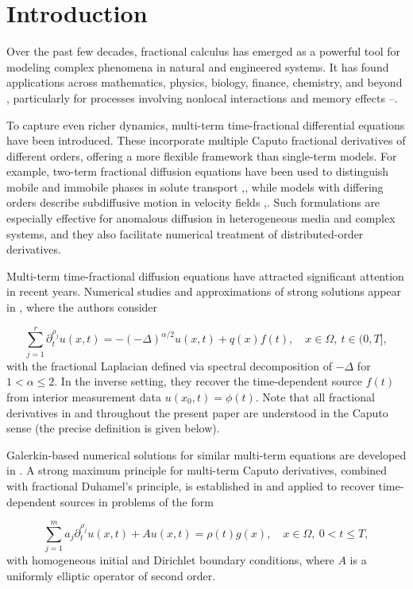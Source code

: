 \documentclass[12pt, reqno]{amsart}
\theoremstyle{definition}
\theoremstyle{remark}
\numberwithin{equation}{section}
\begin{document}
\section{Introduction}



Over the past few decades, fractional calculus has emerged as a powerful tool for modeling complex phenomena in natural and engineered systems. It has found applications across mathematics, physics, biology, finance, chemistry, and beyond \cite{1}, particularly for processes involving nonlocal interactions and memory effects \cite{2}–\cite{6}.

To capture even richer dynamics, multi-term time-fractional differential equations have been introduced. These incorporate multiple Caputo fractional derivatives of different orders, offering a more flexible framework than single-term models. For example, two-term fractional diffusion equations have been used to distinguish mobile and immobile phases in solute transport \cite{7},\cite{8}, while models with differing orders describe subdiffusive motion in velocity fields \cite{9},\cite{10}. Such formulations are especially effective for anomalous diffusion in heterogeneous media and complex systems, and they also facilitate numerical treatment of distributed-order derivatives.

Multi-term time-fractional diffusion equations have attracted significant attention in recent years. Numerical studies and approximations of strong solutions appear in \cite{11}, where the authors consider

$$
\sum_{j=1}^{r} \partial_t^{\rho_j} u(x,t) = -(-\Delta)^{\alpha/2} u(x,t) + q(x) f(t), \quad x \in \Omega, \ t \in (0,T],
$$
with the fractional Laplacian defined via spectral decomposition of \(-\Delta\) for \(1 < \alpha \le 2\). In the inverse setting, they recover the time-dependent source \(f(t)\) from interior measurement data \(u(x_0,t) = \phi(t)\). Note that all fractional derivatives in \cite{11} and throughout the present paper are understood in the Caputo sense (the precise definition is given below).

Galerkin-based numerical solutions for similar multi-term equations are developed in \cite{12}. A strong maximum principle for multi-term Caputo derivatives, combined with fractional Duhamel's principle, is established in \cite{13} and applied to recover time-dependent sources in problems of the form

$$
\sum_{j=1}^{m} a_j \partial_t^{\rho_j} u(x,t) + A u(x,t) = \rho(t) g(x), \quad x \in \Omega, \ 0 < t \le T,
$$
with homogeneous initial and Dirichlet boundary conditions, where \(A\) is a uniformly elliptic operator of second order.
\end{document}
